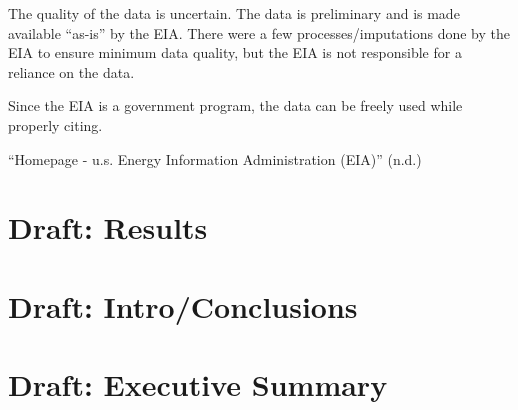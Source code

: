 \documentclass[
  letterpaper,
  DIV=11,
  numbers=noendperiod]{scrreprt}
\begin{document}
The quality of the data is uncertain. The data is preliminary and is
made available ``as-is'' by the EIA. There were a few
processes/imputations done by the EIA to ensure minimum data quality,
but the EIA is not responsible for a reliance on the data.

Since the EIA is a government program, the data can be freely used while
properly citing.

{``Homepage - u.s. Energy Information Administration (EIA)''} (n.d.)

\hypertarget{draft-results}{%
\chapter{Draft: Results}\label{draft-results}}

\hypertarget{draft-introconclusions}{%
\chapter{Draft: Intro/Conclusions}\label{draft-introconclusions}}

\hypertarget{draft-executive-summary}{%
\chapter{Draft: Executive Summary}\label{draft-executive-summary}}
\end{document}
